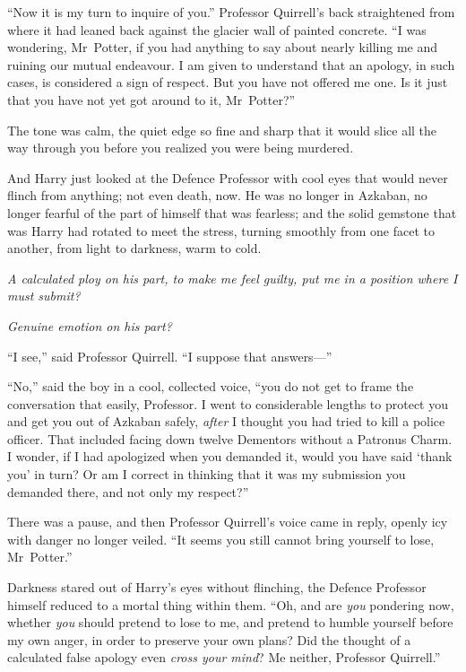 “Now it is my turn to inquire of you.” Professor Quirrell’s back straightened from where it had leaned back against the glacier wall of painted concrete.
“I was wondering, Mr~Potter, if you had anything to say about nearly killing me and ruining our mutual endeavour. I am given to understand that an apology, in such cases, is considered a sign of respect. But you have not offered me one. Is it just that you have not yet got around to it, Mr~Potter?”

The tone was calm, the quiet edge so fine and sharp that it would slice all the way through you before you realized you were being murdered.

And Harry just looked at the Defence Professor with cool eyes that would never flinch from anything; not even death, now. He was no longer in Azkaban, no longer fearful of the part of himself that was fearless; and the solid gemstone that was Harry had rotated to meet the stress, turning smoothly from one facet to another, from light to darkness, warm to cold.

\emph{A calculated ploy on his part, to make me feel guilty, put me in a position where I must submit?}

\emph{Genuine emotion on his part?}

“I see,” said Professor Quirrell.
“I suppose that answers—”

“No,” said the boy in a cool, collected voice, “you do not get to frame the conversation that easily, Professor. I went to considerable lengths to protect you and get you out of Azkaban safely, \emph{after} I thought you had tried to kill a police officer. That included facing down twelve Dementors without a Patronus Charm. I wonder, if I had apologized when you demanded it, would you have said ‘thank you’ in turn? Or am I correct in thinking that it was my submission you demanded there, and not only my respect?”

There was a pause, and then Professor Quirrell’s voice came in reply, openly icy with danger no longer veiled.
“It seems you still cannot bring yourself to lose, Mr~Potter.”

Darkness stared out of Harry’s eyes without flinching, the Defence Professor himself reduced to a mortal thing within them.
“Oh, and are \emph{you} pondering now, whether \emph{you} should pretend to lose to me, and pretend to humble yourself before my own anger, in order to preserve your own plans? Did the thought of a calculated false apology even \emph{cross your mind}? Me neither, Professor Quirrell.”

